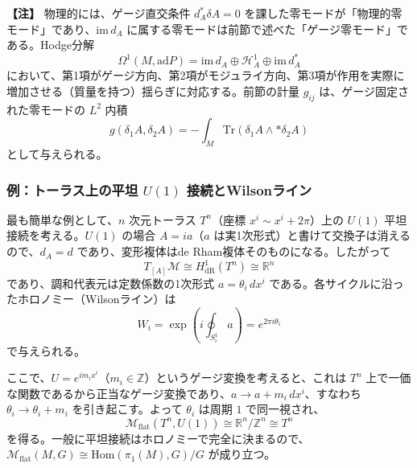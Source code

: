 \documentclass[uplatex, dvipdfmx, book]{jsbook}
\let\origsubsubsection\subsubsection
\renewcommand{\subsection}{\origsubsubsection}
\renewcommand{\subsubsection}{\paragraph}
\newenvironment{note}{\vspace{1ex}\par\footnotesize\noindent\textbf{【注】}}{\par\vspace{1ex}}
\begin{document}
\begin{note}
物理的には、ゲージ直交条件 $d_A^*\delta A = 0$ を課した零モードが「物理的零モード」であり、$\mathrm{im}\,d_A$ に属する零モードは前節で述べた「ゲージ零モード」である。Hodge分解
\begin{equation}
    \Omega^1(M, \mathrm{ad}P) = \mathrm{im}\, d_A \oplus \mathcal{H}^1_A \oplus \mathrm{im}\, d_A^*
\end{equation}
において、第1項がゲージ方向、第2項がモジュライ方向、第3項が作用を実際に増加させる（質量を持つ）揺らぎに対応する。前節の計量 $g_{ij}$ は、ゲージ固定された零モードの $L^2$ 内積
\begin{equation}
    g(\delta_1 A, \delta_2 A) = -\int_M \mathrm{Tr}(\delta_1 A \wedge * \delta_2 A)
\end{equation}
として与えられる。
\end{note}

\subsection{例：トーラス上の平坦 $U(1)$ 接続とWilsonライン}

最も簡単な例として、$n$ 次元トーラス $T^n$（座標 $x^i \sim x^i + 2\pi$）上の $U(1)$ 平坦接続を考える。$U(1)$ の場合 $A = i a$（$a$ は実1次形式）と書けて交換子は消えるので、$d_A = d$ であり、変形複体はde Rham複体そのものになる。したがって
\begin{equation}
    T_{[A]}\mathcal{M} \cong H^1_{\mathrm{dR}}(T^n) \cong \mathbb{R}^n
\end{equation}
であり、調和代表元は定数係数の1次形式 $a = \theta_i\, dx^i$ である。各サイクルに沿ったホロノミー（Wilsonライン）は
\begin{equation}
    W_i = \exp\left( i \oint_{S^1_i} a \right) = e^{2\pi i \theta_i}
\end{equation}
で与えられる。

ここで、$U = e^{i m_i x^i}$（$m_i \in \mathbb{Z}$）というゲージ変換を考えると、これは $T^n$ 上で一価な関数であるから正当なゲージ変換であり、$a \to a + m_i\, dx^i$、すなわち $\theta_i \to \theta_i + m_i$ を引き起こす。よって $\theta_i$ は周期 $1$ で同一視され、
\begin{equation}
    \mathcal{M}_{\text{flat}}(T^n, U(1)) \cong \mathbb{R}^n / \mathbb{Z}^n \cong T^n
\end{equation}
を得る。一般に平坦接続はホロノミーで完全に決まるので、$\mathcal{M}_{\text{flat}}(M, G) \cong \mathrm{Hom}(\pi_1(M), G)/G$ が成り立つ。
\end{document}
